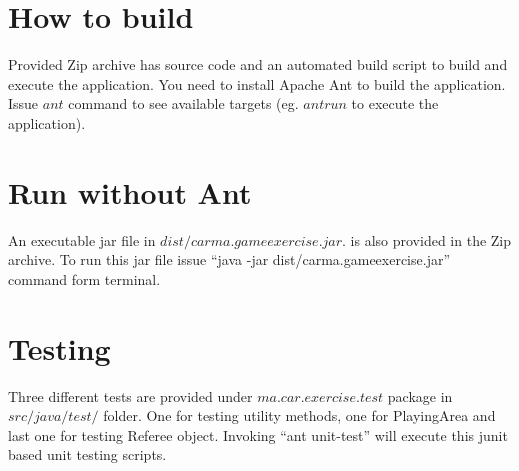 \documentclass[a4paper]{article}
\begin{document}
\section*{How to build}
Provided Zip archive has source code and an automated build script to build and execute the application. You need to install Apache Ant to build the application. Issue $ant$ command to see available targets (eg. $ant run$ to execute the application).

\section*{Run without Ant}
An executable jar file in $dist/carma.gameexercise.jar$. is also provided in the Zip archive. To run this jar file issue ``java -jar dist/carma.gameexercise.jar'' command form terminal.

\section*{Testing}
Three different tests are provided under $ma.car.exercise.test$ package in $src/java/test/$ folder. One for testing utility methods, one for PlayingArea and last one for testing Referee object. Invoking ``ant unit-test'' will execute this junit based unit testing scripts.
\end{document}

